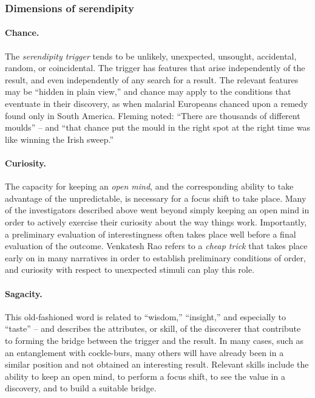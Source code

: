 \documentclass{llncs}
\begin{document}
\subsubsection*{Dimensions of serendipity}


\paragraph{Chance.}

The {\em serendipity trigger} tends to be unlikely, unexpected,
unsought, accidental, random, or coincidental.  The trigger has
features that arise independently of the result, and even
independently of any search for a result.  The relevant features may
be ``hidden in plain view,'' and chance may apply to the conditions
that eventuate in their discovery, as when malarial Europeans chanced
upon a remedy found only in South America.  Fleming \cite{fleming}
noted: ``There are thousands of different moulds'' -- and ``that
chance put the mould in the right spot at the right time was like
winning the Irish sweep.''

\paragraph{Curiosity.}

The capacity for keeping an \emph{open mind}, and the corresponding
ability to take advantage of the unpredictable, is necessary for a
focus shift to take place.  Many of the investigators described above
went beyond simply keeping an open mind in order to actively exercise
their curiosity about the way things work.  Importantly, a preliminary
evaluation of interestingness often takes place well before a final
evaluation of the outcome.  Venkatesh Rao \cite{rao2011tempo} refers
to a \emph{cheap trick} that takes place early on in many narratives
in order to establish preliminary conditions of order, and curiosity
with respect to unexpected stimuli can play this role.

\paragraph{Sagacity.}

This old-fashioned word is related to ``wisdom,'' ``insight,'' and
especially to ``taste'' -- and describes the attributes, or skill, of
the discoverer that contribute to forming the bridge between the
trigger and the result.  In many cases, such as an entanglement with
cockle-burs, many others will have already been in a similar position
and not obtained an interesting result.  Relevant skills include the
ability to keep an open mind, to perform a focus shift, to see the
value in a discovery, and to build a suitable bridge.
\end{document}
